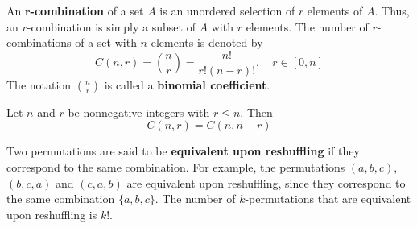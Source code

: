 \begin{definition}[$r$-Combination]
    An \textbf{$\bm{r}$-combination} of a set $A$ is an unordered selection of $r$ elements of $A$.
    Thus, an $r$-combination is simply a subset of $A$ with $r$ elements. The number of
    $r$-combinations of a set with $n$ elements is denoted by
    \[
        C(n,r) = \binom{n}{r} = \frac{n!}{r!(n-r)!},\quad r\in[0,n]
    \]
    The notation $\binom{n}{r}$ is called a \textbf{binomial coefficient}.
\end{definition}

\begin{corollary}
    Let $n$ and $r$ be nonnegative integers with $r \leq n$. Then
    \[
        C(n,r) = C(n,n-r)
    \]
\end{corollary}

\begin{definition}
    Two permutations are said to be \textbf{equivalent upon reshuffling} if they correspond
    to the same combination. For example, the permutations $(a,b,c)$, $(b,c,a)$ and $(c,a,b)$
    are equivalent upon reshuffling, since they correspond to the same combination $\{a,b,c\}$.
    The number of $k$-permutations that are equivalent upon reshuffling is $k!$.
\end{definition}
